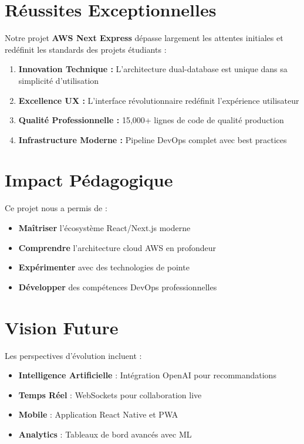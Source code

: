 \documentclass[12pt,a4paper]{report}
\begin{document}
\section{Réussites Exceptionnelles}

Notre projet \textbf{AWS Next Express} dépasse largement les attentes initiales et redéfinit les standards des projets étudiants :

\begin{enumerate}
    \item \textbf{Innovation Technique :} L'architecture dual-database est unique dans sa simplicité d'utilisation
    \item \textbf{Excellence UX :} L'interface révolutionnaire redéfinit l'expérience utilisateur
    \item \textbf{Qualité Professionnelle :} 15,000+ lignes de code de qualité production
    \item \textbf{Infrastructure Moderne :} Pipeline DevOps complet avec best practices
\end{enumerate}

\section{Impact Pédagogique}

Ce projet nous a permis de :
\begin{itemize}
    \item \textbf{Maîtriser} l'écosystème React/Next.js moderne
    \item \textbf{Comprendre} l'architecture cloud AWS en profondeur
    \item \textbf{Expérimenter} avec des technologies de pointe
    \item \textbf{Développer} des compétences DevOps professionnelles
\end{itemize}

\section{Vision Future}

Les perspectives d'évolution incluent :

\begin{itemize}
    \item \textbf{Intelligence Artificielle} : Intégration OpenAI pour recommandations
    \item \textbf{Temps Réel} : WebSockets pour collaboration live
    \item \textbf{Mobile} : Application React Native et PWA
    \item \textbf{Analytics} : Tableaux de bord avancés avec ML
\end{itemize}
\end{document}
